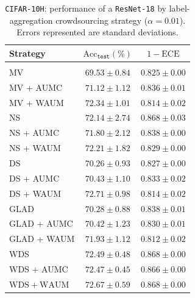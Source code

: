 \begin{table}[t]
    \label{tab:spam-0-expe}
    \begin{footnotesize}
        \begin{center}
            \begin{tabular}{lcc}
                Strategy & $\mathrm{Acc}_{\texttt{test}} (\%)$ & $1-\mathrm{ECE}$
                \\ \hline \\[-0.2cm]
                MV                 & $69.53\pm 0.84$               & $0.825\pm 0.00$                                 \\
                MV + AUMC & $71.12\pm 1.12$ & $\mathbf{0.836\pm 0.01}$ \\
                MV + WAUM & $\mathbf{72.34\pm 1.01}$ & $0.814\pm 0.02$ \\
                \rowcolor{gray!20}NS                 & $72.14\pm 2.74$               & $\mathbf{0.868\pm 0.03}$          \\
                \rowcolor{gray!20}NS + AUMC                 & $71.80\pm 2.12$               & $0.838\pm 0.00$          \\
                \rowcolor{gray!20}NS + WAUM                 & $\mathbf{72.21\pm 1.82}$               & $0.829\pm 0.00$          \\
                DS                 & $70.26\pm 0.93$               & $0.827\pm 0.00$             \\
                DS + AUMC                 & $70.43\pm 1.10$               & $\mathbf{0.833\pm 0.02}$             \\
                DS + WAUM                & $\mathbf{72.71\pm 0.98}$               & $0.814\pm 0.02$             \\
               \rowcolor{gray!20} $\mathrm{GLAD}$    & $70.28\pm 0.88$               & $\mathbf{0.838\pm 0.01}$\\
                \rowcolor{gray!20} $\mathrm{GLAD}$ + AUMC    & $70.42\pm 1.23$               & $0.830\pm 0.01$\\
               \rowcolor{gray!20} $\mathrm{GLAD}$ + WAUM    & $\mathbf{71.93\pm 1.12}$               & $0.812\pm 0.02$\\
                  WDS                & $72.49\pm 0.48$               & $\mathbf{0.868\pm 0.00}$         \\
                  WDS + AUMC                & $72.47\pm 0.45$               & $0.866\pm 0.00$         \\

                  $\mathrm{WDS} + \mathrm{WAUM}$    & $\mathbf{72.67\pm 0.59}$      & $\mathbf{0.868 \pm 0.00}$
            \end{tabular}
        \end{center}
    \end{footnotesize}
    \caption{\texttt{CIFAR-10H}: performance of a \texttt{ResNet-18} by label-aggregation crowdsourcing strategy ($\alpha=0.01$). Errors represented are standard deviations.}
\end{table}


